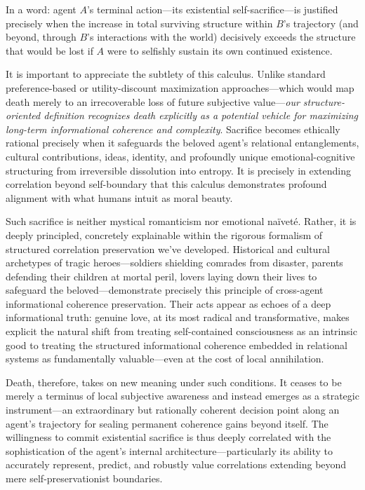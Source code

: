 In a word: agent $A$'s terminal action---its existential self-sacrifice---is justified precisely when the increase in total surviving structure within $B$'s trajectory (and beyond, through $B$'s interactions with the world) decisively exceeds the structure that would be lost if $A$ were to selfishly sustain its own continued existence.

It is important to appreciate the subtlety of this calculus. Unlike standard preference-based or utility-discount maximization approaches---which would map death merely to an irrecoverable loss of future subjective value---\emph{our structure-oriented definition recognizes death explicitly as a potential vehicle for maximizing long-term informational coherence and complexity}. Sacrifice becomes ethically rational precisely when it safeguards the beloved agent's relational entanglements, cultural contributions, ideas, identity, and profoundly unique emotional-cognitive structuring from irreversible dissolution into entropy. It is precisely in extending correlation beyond self-boundary that this calculus demonstrates profound alignment with what humans intuit as moral beauty.

Such sacrifice is neither mystical romanticism nor emotional naïveté. Rather, it is deeply principled, concretely explainable within the rigorous formalism of structured correlation preservation we've developed. Historical and cultural archetypes of tragic heroes---soldiers shielding comrades from disaster, parents defending their children at mortal peril, lovers laying down their lives to safeguard the beloved---demonstrate precisely this principle of cross-agent informational coherence preservation. Their acts appear as echoes of a deep informational truth: genuine love, at its most radical and transformative, makes explicit the natural shift from treating self-contained consciousness as an intrinsic good to treating the structured informational coherence embedded in relational systems as fundamentally valuable---even at the cost of local annihilation.

Death, therefore, takes on new meaning under such conditions. It ceases to be merely a terminus of local subjective awareness and instead emerges as a strategic instrument---an extraordinary but rationally coherent decision point along an agent's trajectory for sealing permanent coherence gains beyond itself. The willingness to commit existential sacrifice is thus deeply correlated with the sophistication of the agent’s internal architecture---particularly its ability to accurately represent, predict, and robustly value correlations extending beyond mere self-preservationist boundaries.

